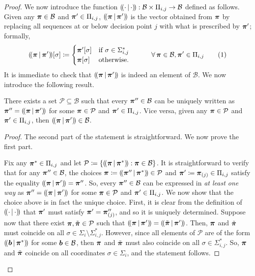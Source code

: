 \begin{proof}
    We now introduce the function $(\!(\cdot\,|\,\cdot)\!) : \mathcal{B} \times \Pi_{i,j} \to \mathcal{B}$ defined as follows.
    Given any $\bm{\pi} \in \mathcal{B}$ and $\bm{\pi}' \in \Pi_{i,j}$, $(\!(\bm{\pi}\,|\,\bm{\pi}')\!)$ is the vector obtained from $\bm{\pi}$ by replacing all sequences at or below decision point $j$ with what is prescribed by $\bm{\pi}'$; formally,
    \[
        \splice{\vpi}{\vpi'}[\sigma] \defeq \begin{cases}
            \vpi'[\sigma] & \text{if } \sigma \in \Sigma_{i,j}^* \\
            \vpi[\sigma]  & \text{otherwise}.
        \end{cases} \qquad\quad \forall\, \vpi\in\mathcal{B}, \vpi'\in\Pi_{i,j}
        \numberthis{eq:def splice}
    \]
    It is immediate to check that $(\!(\bm{\pi}\,|\,\bm{\pi}')\!)$ is indeed an element of $\mathcal{B}$.
    We now introduce the following result.

    \begin{lemma}\label{obs:B}
        There exists a set $\mathcal{P} \subseteq \mathcal{B}$ such that every $\bm{\pi}'' \in \mathcal{B}$ can be uniquely written as $\bm{\pi}'' = (\!(\bm{\pi}\,|\,\bm{\pi}')\!)$ for some $\bm{\pi} \in \mathcal{P}$ and $\bm{\pi}' \in \Pi_{i,j}$. Vice versa, given any $\bm{\pi} \in \mathcal{P}$ and $\bm{\pi}' \in \Pi_{i,j}$, then $(\!(\bm{\pi}\,|\,\bm{\pi}')\!) \in \mathcal{B}$.
    \end{lemma}
    \begin{proof}
        The second part of the statement is straightforward. We now prove the first part.

        Fix any $\bm{\pi}^* \in \Pi_{i,j}$ and let $\mathcal{P} \coloneqq \{(\!(\bm{\pi}\,|\,\bm{\pi}^*)\!) : \bm{\pi} \in \mathcal{B}\}$. It is straightforward to verify that for any $\bm{\pi}'' \in \mathcal{B}$, the choices $\bm{\pi} \coloneqq (\!(\bm{\pi}''\,|\,\bm{\pi}^*)\!) \in \mathcal{P}$ and $\bm{\pi}' \coloneqq \bm{\pi}_{(j)} \in \Pi_{i,j}$ satisfy the equality $(\!(\bm{\pi}\,|\,\bm{\pi}')\!) = \bm{\pi}''$. So, every $\bm{\pi}''\in\mathcal{B}$ can be expressed in \emph{at least one way} as $\bm{\pi}'' = (\!(\bm{\pi}\,|\,\bm{\pi}')\!)$ for some $\bm{\pi} \in \mathcal{P}$ and $\bm{\pi}' \in \Pi_{i,j}$. We now show that the choice above is in fact the unique choice. First, it is clear from the definition of $(\!(\cdot\,|\,\cdot)\!)$ that $\bm{\pi}'$ must satisfy $\bm{\pi}' = \bm{\pi}''_{(j)}$, and so it is uniquely determined. Suppose now that there exist $\bm{\pi}, \tilde{\bm{\pi}}\in\mathcal{P}$ such that $(\!(\bm{\pi}\,|\,\bm{\pi}')\!) = (\!(\tilde{\bm{\pi}}\,|\,\bm{\pi}')\!)$. Then, $\bm{\pi}$ and $\tilde{\bm{\pi}}$ must coincide on all $\sigma \in \Sigma_i \setminus \Sigma_{i,j}^*$. However, since all elements of $\mathcal{P}$ are of the form $(\!(\bm{b}\,|\,\bm{\pi}^*)\!)$ for some $\bm{b} \in \mathcal{B}$, then $\bm{\pi}$ and $\tilde{\bm{\pi}}$ must also coincide on all $\sigma \in\Sigma_{i,j}^*$. So, $\bm{\pi}$ and $\tilde{\bm{\pi}}$ coincide on all coordinates $\sigma\in\Sigma_i$, and the statement follows.
    \end{proof}


\end{proof}
